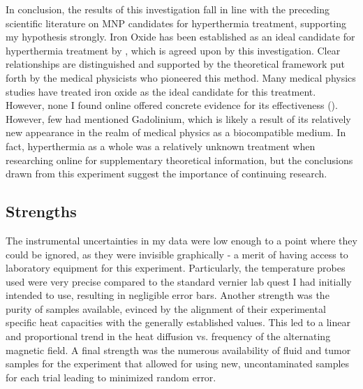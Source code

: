 \documentclass[12pt]{article}
\numberwithin{equation}{section}
\numberwithin{equation}{section}
\begin{document}
{In conclusion, the results of this investigation fall in line with the preceding scientific literature on MNP candidates for hyperthermia treatment, supporting my hypothesis strongly. Iron Oxide has been established as an ideal candidate for hyperthermia treatment by} \cite{JIANG2022107707}, {which is agreed upon by this investigation. Clear relationships are distinguished and supported by the theoretical framework put forth by the medical physicists who pioneered this method. Many medical physics studies have treated iron oxide as the ideal candidate for this treatment. However, none I found online offered concrete evidence for its effectiveness} (\cite{JIANG2022107707}). However, few had mentioned Gadolinium, which is likely a result of its relatively new appearance in the realm of medical physics as a biocompatible medium. In fact, hyperthermia as a whole was a relatively unknown treatment when researching online for supplementary theoretical information, but the conclusions drawn from this experiment suggest the importance of continuing research.

\subsection{Strengths}
The instrumental uncertainties in my data were low enough to a point where they could be ignored, as they were invisible graphically {- a merit of having access to laboratory equipment for this experiment. Particularly, the temperature probes used were very precise compared to the standard vernier lab quest I had initially intended to use, resulting in negligible error bars. Another strength was the purity of samples available, evinced by the alignment of their experimental specific heat capacities with the generally established values. This led to a linear and proportional trend in the heat diffusion vs. frequency of the alternating magnetic field. A final strength was the numerous availability of fluid and tumor samples for the experiment that allowed for using new, uncontaminated samples for each trial leading to minimized random error.}
\end{document}
